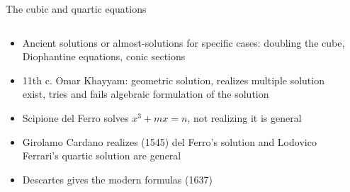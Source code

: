 \begin{frame}{The cubic and quartic equations}

\begin{columns}

  \begin{column}{7.5cm}
  \begin{itemize}
  \item Ancient solutions or almost-solutions for specific cases:
    doubling the cube, Diophantine equations, conic sections
  \item 11th c. Omar Khayyam: geometric solution, realizes multiple
    solution exist, tries and fails algebraic formulation of the
    solution
  \item Scipione del Ferro solves $x^3 + mx = n$, not
    realizing it is general
  \item Girolamo Cardano realizes (1545) del Ferro's solution and
    Lodovico Ferrari's quartic solution are general
  \item Descartes gives the modern formulas (1637)
  \end{itemize}
  \end{column}

  \begin{column}{4.5cm}
  \end{column}

\end{columns}

\end{frame}



